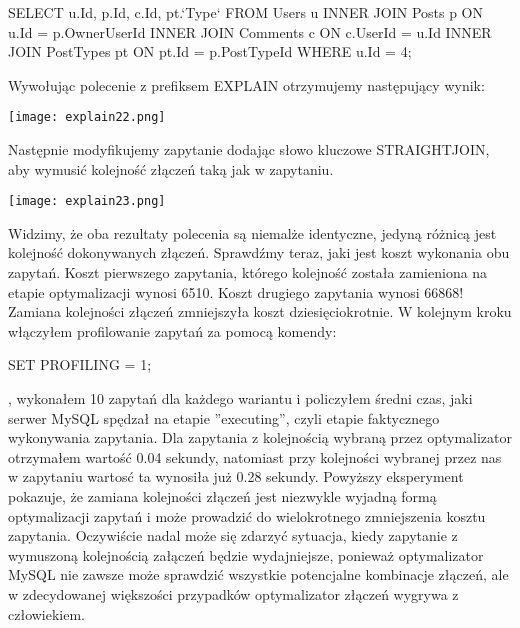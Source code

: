 \begin{spverbatim}
	SELECT u.Id, p.Id, c.Id, pt.`Type` FROM Users u INNER JOIN Posts p ON u.Id = p.OwnerUserId	INNER JOIN Comments c ON c.UserId = u.Id INNER JOIN PostTypes pt ON pt.Id = p.PostTypeId WHERE u.Id = 4;
\end{spverbatim}

Wywołując polecenie z prefiksem EXPLAIN otrzymujemy następujący wynik:
\begin{center}
	\texttt{[image: explain22.png]} 
\end{center}
Następnie modyfikujemy zapytanie dodając słowo kluczowe STRAIGHT\textunderscore JOIN, aby wymusić kolejność złączeń taką jak w zapytaniu.
\begin{center}
	\texttt{[image: explain23.png]} 
\end{center}
Widzimy, że oba rezultaty polecenia są niemalże identyczne, jedyną różnicą jest kolejność dokonywanych złączeń. Sprawdźmy teraz, jaki jest koszt wykonania obu zapytań. Koszt pierwszego zapytania, którego kolejność została zamieniona na etapie optymalizacji wynosi 6510. Koszt drugiego zapytania wynosi 66868! Zamiana kolejności złączeń zmniejszyła koszt dziesięciokrotnie.
W kolejnym kroku włączyłem profilowanie zapytań za pomocą komendy:
\begin{spverbatim}
	SET PROFILING = 1;
\end{spverbatim}, wykonałem 10 zapytań dla każdego wariantu i policzyłem średni czas, jaki serwer MySQL spędzał na etapie ''executing'', czyli etapie faktycznego wykonywania zapytania. Dla zapytania z kolejnością wybraną przez optymalizator otrzymałem wartość 0.04 sekundy, natomiast przy kolejności wybranej przez nas w zapytaniu wartosć ta wynosiła już 0.28 sekundy. Powyższy eksperyment pokazuje, że zamiana kolejności złączeń jest niezwykle wyjadną formą optymalizacji zapytań i może prowadzić do wielokrotnego zmniejszenia kosztu zapytania. Oczywiście nadal może się zdarzyć sytuacja, kiedy zapytanie z wymuszoną kolejnością załączeń będzie wydajniejsze, ponieważ optymalizator MySQL nie zawsze może sprawdzić wszystkie potencjalne kombinacje złączeń, ale w zdecydowanej większości przypadków optymalizator złączeń wygrywa z człowiekiem.

